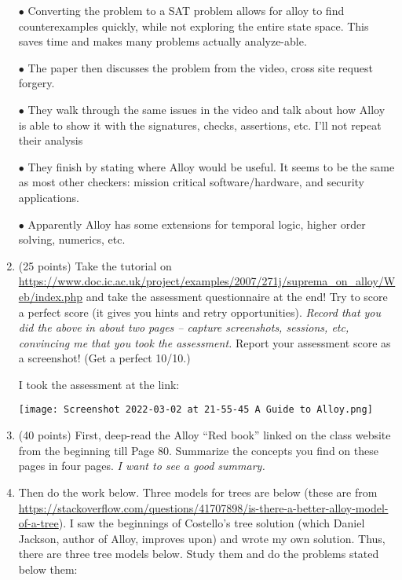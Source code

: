 \documentclass[11pt]{article}
\begin{document}
\begin{enumerate}
      $\bullet$ Converting the problem to a SAT problem allows for alloy to find counterexamples quickly, while not exploring the entire state space. This saves time and makes many problems actually analyze-able.
      
      $\bullet$ The paper then discusses the problem from the video, cross site request forgery. 
      
      $\bullet$ They walk through the same issues in the video and talk about how Alloy is able to show it with the signatures, checks, assertions, etc. I'll not repeat their analysis
      
      $\bullet$ They finish by stating where Alloy would be useful. It seems to be the same as most other checkers: mission critical software/hardware, and security applications.
      
      $\bullet$ Apparently Alloy has some extensions for temporal logic, higher order solving, numerics, etc.
  
\clearpage

\item (25 points)
  Take the tutorial on
  \url{https://www.doc.ic.ac.uk/project/examples/2007/271j/suprema_on_alloy/Web/index.php}
  and take the assessment questionnaire at the end! Try to score a perfect score (it gives you
  hints and retry opportunities).
  {\em Record that you did the above in about two pages -- capture screenshots, sessions, etc, convincing
    me that you took the assessment.} Report your assessment score as a screenshot! (Get a perfect 10/10.)
    
I took the assessment at the link: 

\texttt{[image: Screenshot 2022-03-02 at 21-55-45 A Guide to Alloy.png]}

\clearpage

\item (40 points)
  First, deep-read the Alloy ``Red book'' linked on the class website
  from the beginning till Page 80.
  Summarize the concepts you find on these pages in four pages.
  {\em I want to see a good summary.}
  \item[] Then do the work below.
    Three models for trees are below (these
  are from
  \url{https://stackoverflow.com/questions/41707898/is-there-a-better-alloy-model-of-a-tree}).
  I saw the beginnings of Costello's tree solution (which Daniel Jackson, author of Alloy, improves upon) and wrote
  my own solution.
  Thus, there are three tree models below.
  Study them and do the problems stated below them:
  \begin{scriptsize}
\begin{verbatim}


\end{verbatim}
\end{scriptsize}
\end{enumerate}
\end{document}
